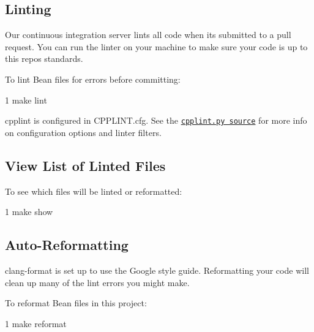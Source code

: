 \subsection*{Linting}

Our continuous integration server lints all code when it\textquotesingle{}s submitted to a pull request. You can run the linter on your machine to make sure your code is up to this repo\textquotesingle{}s standards.

To lint Bean files for errors before committing\+:


\begin{DoxyCode}
1 make lint
\end{DoxyCode}


cpplint is configured in {\ttfamily C\+P\+P\+L\+I\+N\+T.\+cfg}. See the \href{https://google-styleguide.googlecode.com/svn/trunk/cpplint/cpplint.py}{\tt cpplint.\+py source} for more info on configuration options and linter filters.

\subsection*{View List of Linted Files}

To see which files will be linted or reformatted\+:


\begin{DoxyCode}
1 make show
\end{DoxyCode}


\subsection*{Auto-\/\+Reformatting}

clang-\/format is set up to use the Google style guide. Reformatting your code will clean up many of the lint errors you might make.

To reformat Bean files in this project\+:


\begin{DoxyCode}
1 make reformat
\end{DoxyCode}
 